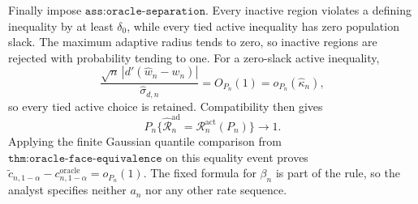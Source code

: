 Finally impose \(\texttt{ass:oracle-separation}\). Every inactive region violates a defining inequality by at least \(\delta_0\), while every tied active inequality has zero population slack. The maximum adaptive radius tends to zero, so inactive regions are rejected with probability tending to one. For a zero-slack active inequality,
\[
 \frac{\sqrt n\,|d'(\widehat w_n-w_n)|}{\widehat\sigma_{d,n}}=O_{P_n}(1)
 =o_{P_n}(\widehat\kappa_n),
\]
so every tied active choice is retained. Compatibility then gives
\[
 P_n\{\widehat{\mathcal R}_n^{\mathrm{ad}}
       =\mathcal R_n^{\mathrm{act}}(P_n)\}\longrightarrow1.
\]
Applying the finite Gaussian quantile comparison from \(\texttt{thm:oracle-face-equivalence}\) on this equality event proves
\(\widetilde c_{n,1-\alpha}-c^{\mathrm{oracle}}_{n,1-\alpha}=o_{P_n}(1)\). The fixed formula for \(\beta_n\) is part of the rule, so the analyst specifies neither \(a_n\) nor any other rate sequence.
